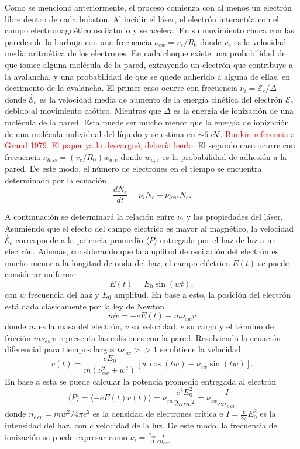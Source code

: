\documentclass[aps,prb,twocolumn,superscriptaddress,floatfix,longbibliography,10pt]{revtex4-2}
\newif\ifptitle
\newif\ifpnumber
\newcounter{para}
\newcommand\ptitle[1]{\par\refstepcounter{para}
{\ifpnumber{\noindent\textcolor{lightgray}{\textbf{\thepara}}\indent}\fi}
{\ifptitle{\textbf{[{#1}]}}\fi}}
\begin{document}
Como se mencionó anteriormente, el proceso comienza con al menos un electrón libre dentro de cada bubston. Al incidir el láser, el electrón interactúa con el campo electromagnético oscilatorio y se acelera. En su movimiento choca con las paredes de la burbuja con una frecuencia $\nu_{e w} = \bar{v_e}/R_0$ donde $\bar{v_e}$ es la velocidad media aritmética de los electrones. En cada choque existe una probabilidad de que ionice alguna molécula de la pared, extrayendo un electrón que contribuye a la avalancha, y una probabilidad de que se quede adherido a alguna de ellas, en decrimento de la avalancha. El primer caso ocurre con frecuencia $\nu_i = \dot{\mathcal{E}_e}/\Delta$ donde $\dot{\mathcal{E}_e}$ es la velocidad media de aumento de la energía cinética del electrón ${\mathcal{E}_e}$ debido al movimiento caótico. Mientras que $\Delta$ es la energía de ionización de una molécula de la pared. Esta puede ser mucho menor que la energía de ionización de una molécula individual del líquido y se estima en $\sim 6$ eV. \textcolor{red}{Bunkin referencia a Grand 1979. El paper ya lo descargué, debería leerlo}. El segundo caso ocurre con frecuencia $\nu_{loss} = (\bar{v}_e/R_0) w_{a,e}$ donde $w_{a,e}$ es la probabilidad de adhesión a la pared. De este modo, el número de electrones en el tiempo se encuentra determinado por la ecuación
\begin{equation}
  \frac{dN_e}{dt} = \nu_i N_e - \nu_{loss} N_e.
  \label{eq:dNedt_1}
\end{equation}


\ptitle{Determinación de la frecuencia de ionización}


A continuación se determinará la relación entre $\nu_i$ y las propiedades del láser. Asumiendo que el efecto del campo eléctrico es mayor al magnético, la velocidad $\dot{\mathcal{E}_e}$ corresponde a la potencia promedio $\langle P \rangle$ entregada por el haz de luz a un electrón. Además, considerando que la amplitud de oscilación del electrón es mucho menor a la longitud de onda del haz, el campo eléctrico $E(t)$ se puede considerar uniforme
\[E(t) = E_0 \sin{(w t)},\]
con $w$ frecuencia del haz y $E_0$ amplitud. En base a esto, la posición del electrón está dada clásicamente por la ley de Newton
\[m \dot{v} = -e E(t) -m \nu_{e w} v\]
donde $m$ es la masa del electrón, $v$ su velocidad, $e$ su carga y el término de fricción $m \nu_{e w} v$ representa las colisiones con la pared. Resolviendo la ecuación diferencial para tiempos largos $t \nu_{e w} >> 1$ se obtiene la velocidad
\[v(t) = \frac{e E_0}{m(\nu_{e w}^2 + w^2)}[w \cos{(t w)} - \nu_{e w} \sin{(t w)}]. \]
En base a esta se puede calcular la potencia promedio entregada al electrón 
\[\langle P \rangle = \langle - e E(t) v(t) \rangle = \nu_{e w}\frac{e^2 E_0^2}{2 m w^2} = \nu_{e w} \frac{I}{c n_{e \, cr}}\]
donde $n_{e \, cr} = mw^2/4 \pi e^2$ es la densidad de electrones crítica e $I = \frac{c}{8 \pi} E_0^2$ es la intensidad del haz, con $c$ velocidad de la luz. De este modo, la frecuencia de ionización se puede expresar como $\nu_i = \frac{\nu_{e w}}{\Delta} \frac{I}{c n_{e \, cr}}$
\end{document}
